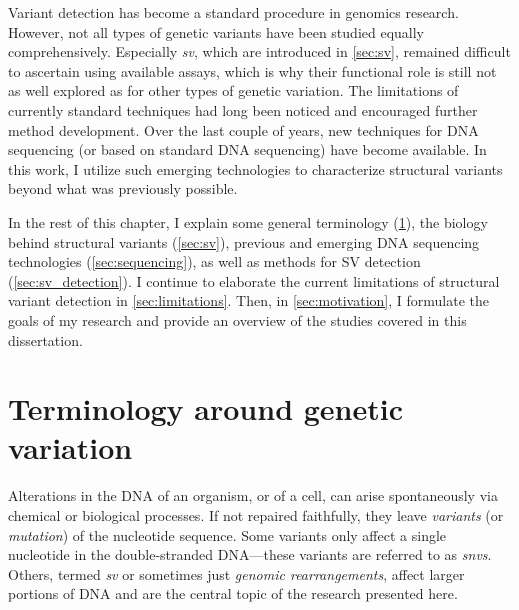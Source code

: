 Variant detection has become a standard procedure in genomics research. However,
not all types of genetic variants have been studied equally comprehensively.
Especially \emph{\acf{sv}}, which are introduced in \cref{sec:sv}, remained
difficult to ascertain using available assays, which is why their functional
role is still not as well explored as for other types of genetic variation. The
limitations of currently standard techniques had long been noticed and
encouraged further method development. Over the last couple of years, new
techniques for DNA sequencing (or based on standard DNA sequencing) have become
available. In this work, I utilize such emerging technologies to characterize
structural variants beyond what was previously possible.

In the rest of this chapter, I explain some general terminology
(\cref{sec:variation}), the biology behind structural variants
(\cref{sec:sv}), previous and emerging DNA sequencing technologies
(\cref{sec:sequencing}), as well as methods for SV detection
(\cref{sec:sv_detection}). I continue to elaborate the current limitations
of structural variant detection in \cref{sec:limitations}. Then, in
\cref{sec:motivation}, I formulate the goals of my research and provide an
overview of the studies covered in this dissertation.






\section{Terminology around genetic variation}
\label{sec:variation}

Alterations in the DNA of an organism, or of a cell, can arise spontaneously
via chemical or biological processes. If not repaired faithfully, they leave
\emph{variants} (or \emph{mutation}) of the nucleotide sequence. Some variants
only affect a single nucleotide in the double-stranded DNA---these variants are
referred to as \emph{\acfp{snv}}. Others, termed \emph{\acf{sv}} or sometimes
just \emph{genomic rearrangements}, affect larger portions of DNA and are the
central topic of the research presented here.

